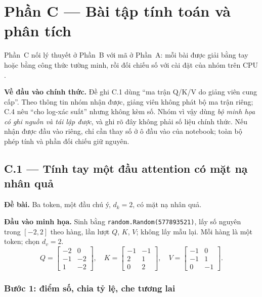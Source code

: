 \section{Phần C --- Bài tập tính toán và phân tích}
\label{sec:phan-c}

Phần~C nối lý thuyết ở Phần~B với mã ở Phần~A: mỗi bài được giải bằng tay hoặc
bằng công thức tường minh, rồi đối chiếu số với cài đặt của nhóm trên CPU
\cite[tr.~19]{de}.

\textbf{Về đầu vào chính thức.} Đề ghi C.1 dùng ``ma trận Q/K/V do giảng viên cung
cấp''. Theo thông tin nhóm nhận được, giảng viên không phát bộ ma trận riêng; C.4
nêu ``cho log-xác suất'' nhưng không kèm số. Nhóm vì vậy dùng \emph{bộ minh họa có
ghi nguồn và tái lập được}, và ghi rõ đây không phải số liệu chính thức. Nếu nhận
được đầu vào riêng, chỉ cần thay số ở ô đầu vào của notebook; toàn bộ phép tính và
phần đối chiếu giữ nguyên.

\subsection{C.1 --- Tính tay một đầu attention có mặt nạ nhân quả}
\label{sec:c1}

\textbf{Đề bài.} Ba token, một đầu chú ý, $d_k=2$, có mặt nạ nhân quả.

\textbf{Đầu vào minh họa.} Sinh bằng \texttt{random.Random(577893521)}, lấy số
nguyên trong $[-2,2]$ theo hàng, lần lượt $Q$, $K$, $V$; không lấy mẫu lại. Mỗi
hàng là một token; chọn $d_v=2$.
\[
  Q=\begin{bmatrix}-2&0\\-1&-2\\1&-2\end{bmatrix},\quad
  K=\begin{bmatrix}-1&-1\\2&1\\0&2\end{bmatrix},\quad
  V=\begin{bmatrix}-1&0\\-1&1\\0&-1\end{bmatrix}.
\]

\subsubsection{Bước 1: điểm số, chia tỷ lệ, che tương lai}

